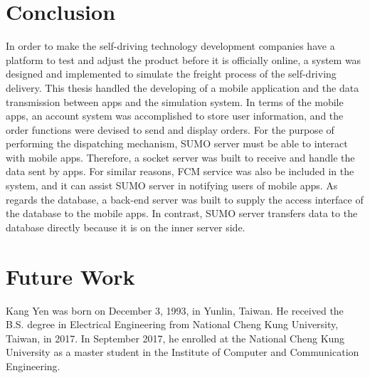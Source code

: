 \documentclass[12pt]{ksthesis}
\begin{document}
\begin{thesis}
{\section{Conclusion}
In order to make the self-driving technology development companies have a platform to test and adjust the product before it is officially online, a system was designed and implemented to simulate the freight process of the self-driving delivery. This thesis handled the developing of a mobile application and the data transmission between apps and the simulation system. In terms of the mobile apps, an account system was accomplished to store user information, and the order functions were devised to send and display orders. For the purpose of performing the dispatching mechanism, SUMO server must be able to interact with mobile apps. Therefore, a socket server was built to receive and handle the data sent by apps. For similar reasons, FCM service was also be included in the system, and it can assist SUMO server in notifying users of mobile apps. As regards the database, a back-end server was built to supply the access interface of the database to the mobile apps. In contrast, SUMO server transfers data to the database directly because it is on the inner server side.


\section{Future Work}


} \end{thesis}

\singlespace {\large



}



\doublespace

\begin{vita}
\Thesisspace \large{

Kang Yen was born on December 3, 1993, in Yunlin, Taiwan.  He received the B.S. degree in Electrical Engineering from National Cheng Kung University, Taiwan, in 2017. In September 2017, he enrolled at the National Cheng Kung University as a master student in the Institute of Computer and Communication Engineering.

}\end{vita}
\end{document}
